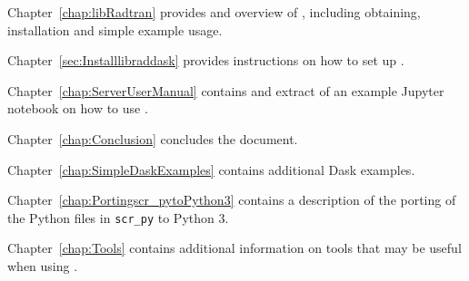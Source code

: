 Chapter~\ref{chap:libRadtran}  provides and overview of \libradtran{}, including obtaining, installation and simple example usage.

Chapter~\ref{sec:Installlibraddask}  provides instructions on how to set up \libraddask{}.

Chapter~\ref{chap:ServerUserManual}  contains and extract of an example Jupyter notebook on how to use  \libraddask{}.

Chapter~\ref{chap:Conclusion} concludes the document.

Chapter~\ref{chap:SimpleDaskExamples} contains additional Dask examples.

Chapter~\ref{chap:Portingscr_pytoPython3}  contains a description of the porting of the \libradtran{} Python files in \lstinline{scr_py} to Python 3.

Chapter~\ref{chap:Tools}  contains additional information on tools that may be useful when using \libraddask{}.
 